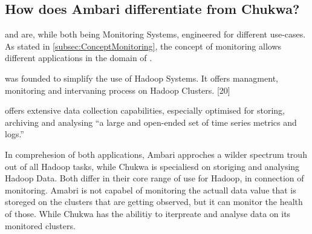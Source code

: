 \subsection{How does Ambari differentiate from Chukwa?}
\label{subsec:Differentiation}

\amb and \chuk are, while both being Monitoring Systems, engineered for different use-cases. 
As stated in \ref{subsec:ConceptMonitoring}, the concept of monitoring allows different applications in the domain of \isds. 

\amb was founded to simplify the use of Hadoop Systems. It offers managment, monitoring and intervaning process on Hadoop Clusters. [20] 

\chuk offers extensive data collection capabilities, especially optimised for storing, archiving and analysing ``a large and open-ended set of time series metrics and logs.''~\cite{Boulona}

In comprehesion of both applications, Ambari approches a wilder spectrum trouh out of all Hadoop tasks, while Chukwa is specialiesd on storiging and analysing Hadoop Data. Both differ in their core range of use for Hadoop, in connection of monitoring. Amabri is not capabel of monitoring the actuall data value that is storeged on the clusters that are getting observed, but it can monitor the health of those. While Chukwa has the abilitiy to iterpreate and analyse data on its monitored clusters.